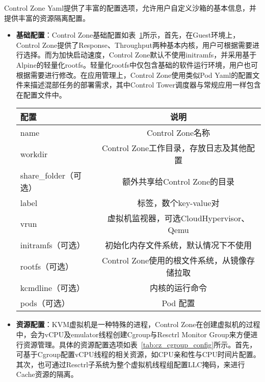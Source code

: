 Control Zone Yaml提供了丰富的配置选项，允许用户自定义沙箱的基本信息，并提供丰富的资源隔离配置。

\begin{itemize}
    \item \textbf{基础配置}：Control Zone基础配置如表~\ref{tab:cz_meta_config}所示，首先，在Guest环境上，Control Zone提供了Response、Throughput两种基本内核，用户可根据需要进行选择。而为加快启动速度，Control Zone默认不使用initramfs，并采用基于Alpine的轻量化rootfs。轻量化rootfs中仅包含基础的软件运行环境，用户也可根据需要进行修改。在应用管理上，Control Zone使用类似Pod Yaml的配置文件来描述混部任务的部署需求，其中Control Tower调度器与常规应用一样包含在配置文件中。

\begin{table}[H]
    \label{tab:cz_meta_config}
    \footnotesize%
    \setlength{\tabcolsep}{4pt}%
    \renewcommand{\arraystretch}{1.25}%
    \centering
    \begin{tabular}{lc}
        \hline
        配置 & 说明\\
        \hline
        name & Control Zone名称 \\
        workdir & Control Zone工作目录，存放日志及其他配置 \\
        share\_folder（可选） & 额外共享给Control Zone的目录 \\
        label & 标签，数个key-value对 \\
        vrun & 虚拟机监视器，可选CloudHypervisor、Qemu \\
        initramfs（可选） & 初始化内存文件系统，默认情况下不使用 \\
        rootfs（可选） & Control Zone使用的根文件系统，从镜像存储拉取\\
        kcmdline（可选） & 内核的运行命令 \\
        pods（可选） & Pod 配置 \\
        \hline
    \end{tabular}
\end{table}

    \item \textbf{资源配置}：KVM虚拟机是一种特殊的进程，Control Zone在创建虚拟机的过程中，会为vCPU及emulator线程创建Cgroup与Resctrl Monitor Group来方便进行资源管理。具体的资源配置选项如表~\ref{tab:cz_cgroup_config}所示。首先，可基于Cgroup配置vCPU线程的相关资源，如CPU亲和性与CPU时间片配置。其次，也可通过Resctrl子系统为整个虚拟机线程组配置LLC掩码，来进行Cache资源的隔离。


\end{itemize}
